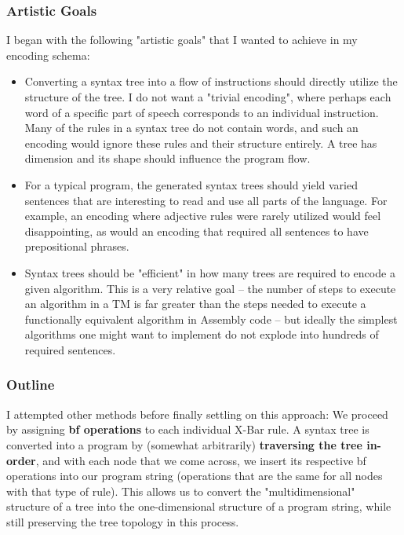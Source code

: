 \documentclass[runningheads]{llncs}
\begin{document}
\subsubsection{Artistic Goals}
I began with the following "artistic goals" that I wanted to achieve in my encoding schema:
\begin{itemize}
    \item Converting a syntax tree into a flow of instructions should directly utilize the structure of the tree. I do not want a "trivial encoding", where perhaps each word of a specific part of speech corresponds to an individual instruction. Many of the rules in a syntax tree do not contain words, and such an encoding would ignore these rules and their structure entirely. A tree has dimension and its shape should influence the program flow.
		\item For a typical program, the generated syntax trees should yield varied sentences that are interesting to read and use all parts of the language. For example, an encoding where adjective rules were rarely utilized would feel disappointing, as would an encoding that required all sentences to have prepositional phrases.
		\item Syntax trees should be "efficient" in how many trees are required to encode a given algorithm. This is a very relative goal -- the number of steps to execute an algorithm in a TM is far greater than the steps needed to execute a functionally equivalent algorithm in Assembly code -- but ideally the simplest algorithms one might want to implement do not explode into hundreds of required sentences.
\end{itemize}
\subsubsection{Outline}
I attempted other methods before finally settling on this approach: We proceed by assigning \textbf{bf operations} to each individual X-Bar rule. A syntax tree is converted into a program by (somewhat arbitrarily) \textbf{traversing the tree in-order}, and with each node that we come across, we insert its respective bf operations into our program string (operations that are the same for all nodes with that type of rule). This allows us to convert the "multidimensional" structure of a tree into the one-dimensional structure of a program string, while still preserving the tree topology in this process.


\end{document}
